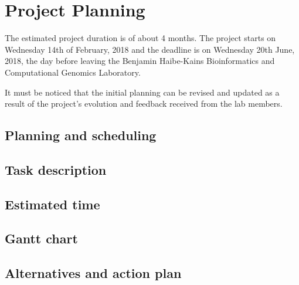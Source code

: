 

\section{Project Planning}

The estimated project duration is of about 4 months. The project starts on Wednesday 14th of 
February, 2018 and the deadline is on Wednesday 20th June, 2018, the day before leaving the 
Benjamin Haibe-Kains Bioinformatics and Computational Genomics Laboratory.

It must be noticed that the initial planning can be revised and updated as a result of the 
project's evolution and feedback received from the lab members. 

\subsection{Planning and scheduling}

\subsection{Task description}

\subsection{Estimated time}

\subsection{Gantt chart}

\subsection{Alternatives and action plan}
